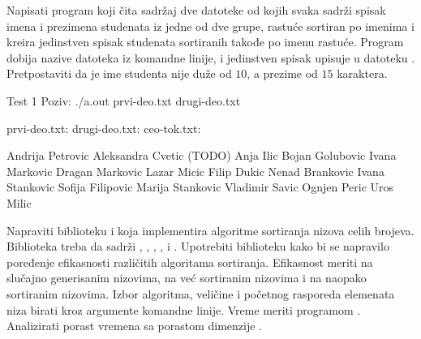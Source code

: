 \begin{Exercise}[label=506]
  Napisati program koji čita sadržaj dve datoteke od kojih svaka
  sadrži spisak imena i prezimena studenata iz jedne od dve grupe,
  rastuće sortiran po imenima i kreira jedinstven spisak studenata
  sortiranih takođe po imenu rastuće.  Program dobija nazive datoteka
  iz komandne linije, i jedinstven spisak upisuje u datoteku
  . Pretpostaviti da je ime studenta nije duže od
  $10$, a prezime od $15$ karaktera.


\begin{maxitest}
\begin{test}{Test 1}
Poziv: ./a.out prvi-deo.txt drugi-deo.txt

prvi-deo.txt:          drugi-deo.txt:         ceo-tok.txt:

Andrija Petrovic       Aleksandra Cvetic      (TODO)
Anja Ilic              Bojan Golubovic
Ivana Markovic         Dragan Markovic
Lazar Micic            Filip Dukic
Nenad Brankovic        Ivana Stankovic
Sofija Filipovic       Marija Stankovic
Vladimir Savic         Ognjen Peric
                       Uros Milic
\end{test}
\end{maxitest}
  
\end{Exercise}

\begin{Exercise}[label=507]
  Napraviti biblioteku  i  koja
  implementira algoritme sortiranja nizova celih brojeva. Biblioteka
  treba da sadrži , , ,
  ,  i . Upotrebiti
  biblioteku kako bi se napravilo poređenje efikasnosti različitih
  algoritama sortiranja. Efikasnost meriti na slučajno generisanim
  nizovima, na već sortiranim nizovima i na naopako sortiranim
  nizovima. Izbor algoritma, veličine i početnog rasporeda elemenata
  niza birati kroz argumente komandne linije.  Vreme meriti programom
  . Analizirati porast vremena sa porastom dimenzije
  .
  
\end{Exercise}

